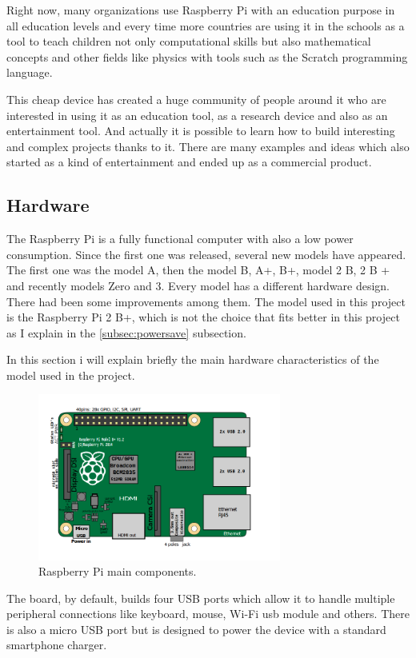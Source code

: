 		Right now, many organizations use Raspberry Pi with an education purpose in all education levels and every time more countries are using it in the schools as a tool to teach children not only computational skills but also mathematical concepts and other fields like physics with tools such as the Scratch programming language.

		This cheap device has created a huge community of people around it who are interested in using it as an education tool, as a research device and also as an entertainment tool. And actually it is possible to learn how to build interesting and complex projects thanks to it. There are many examples and ideas which also started as a kind of entertainment and ended up as a commercial product.

		\subsection{Hardware}
		The Raspberry Pi is a fully functional computer with also a low power consumption. Since the first one was released, several new models have appeared. The first one was the model A, then the model B, A+, B+, model 2 B, 2 B + and recently models Zero and 3.
		Every model has a different hardware design. There had been some improvements among them. The model used in this project is the Raspberry Pi 2 B+, which is not the choice that fits better in this project as I explain in the \ref{subsec:powersave} subsection.

		In this section i will explain briefly the main hardware characteristics of the model used in the project.

		\begin{figure}[h!]
		\includegraphics[width=8cm]{fig/rpi2hw.png}
		\centering
		\caption{Raspberry Pi main components.\label{fig:rpi2hw}}
		\end{figure}

		The board, by default, builds four USB ports which allow it to handle multiple peripheral connections like keyboard, mouse, Wi-Fi usb module and others. There is also a micro USB port but is designed to power the device with a standard smartphone charger.

